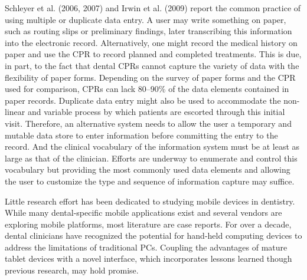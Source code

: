 \documentclass[11pt]{article}
\begin{document}
Schleyer et al. (2006, 2007) and Irwin et al. (2009) report the common practice of using multiple or duplicate data entry. A user may write something on paper, such as routing slips or preliminary findings, later transcribing this information into the electronic record. Alternatively, one might record the medical history on paper and use the CPR to record planned and completed treatments. This is due, in part, to the fact that dental CPRs cannot capture the variety of data with the flexibility of paper forms\cite{Schleyer2007A-Qualitative-I}. Depending on the survey of paper forms and the CPR used for comparison, CPRs can lack  80--90\% of the data elements contained in paper records. Duplicate data entry might also be used to accommodate the non-linear and variable process by which patients are escorted through this initial visit. Therefore, an alternative system needs to allow the user a temporary and mutable data store to enter information before committing the entry to the record. And the clinical vocabulary of the information system must be at least as large as that of the clinician. Efforts are underway to enumerate and control this vocabulary \cite{Kalenderian:2011ly,White:2011zr,Acharya2009Electronic-dent,Emmott2010Electronic-dent} but providing the most commonly used data elements and allowing the user to customize the type and sequence of information capture may suffice.

Little research effort has been dedicated to studying mobile devices in dentistry. While many dental-specific mobile applications exist and several vendors are exploring mobile platforms, most literature are case reports. For over a decade, dental clinicians have recognized the potential for hand-held computing devices to address the limitations of traditional PCs\cite{Taylor2002Handheld-comput,Jablow2003Your-practice-i}. Coupling the advantages of mature tablet devices with a novel interface, which incorporates lessons learned though previous research, may hold promise.
\end{document}

